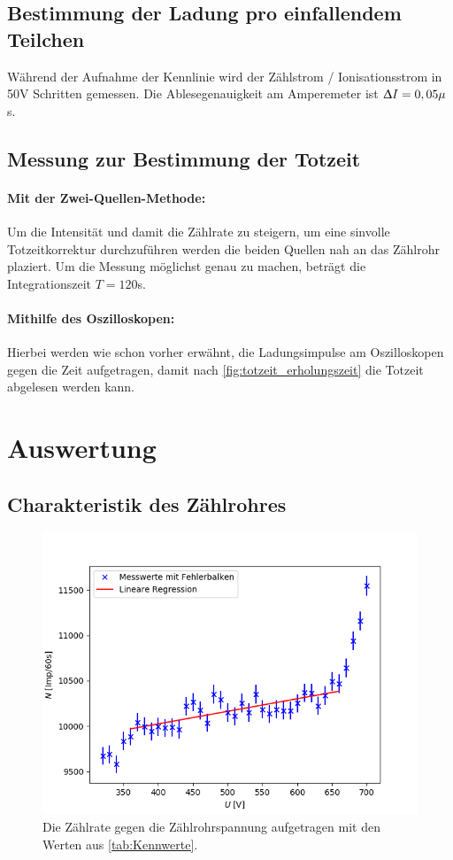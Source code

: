 \documentclass[titlepage = firstcover]{scrartcl}
\begin{document}
      \subsection{Bestimmung der Ladung pro einfallendem Teilchen}
        Während der Aufnahme der Kennlinie wird der Zählstrom / Ionisationsstrom in 50V Schritten gemessen. Die Ablesegenauigkeit am Amperemeter ist $\Updelta I = 0,05 \mu$s.

      \subsection{Messung zur Bestimmung der Totzeit}
        \paragraph{Mit der Zwei-Quellen-Methode:}
          Um die Intensität und damit die Zählrate zu steigern, um eine sinvolle Totzeitkorrektur durchzuführen werden die beiden Quellen nah an das Zählrohr plaziert. Um die Messung möglichst genau zu machen, beträgt die Integrationszeit $T = 120$s.
        \paragraph{Mithilfe des Oszilloskopen:}
          Hierbei werden wie schon vorher erwähnt, die Ladungsimpulse am Oszilloskopen gegen die Zeit aufgetragen, damit nach \autoref{fig:totzeit_erholungszeit} die Totzeit abgelesen werden kann.

    
    \newpage
    \section{Auswertung}
      \subsection{Charakteristik des Zählrohres}
      \begin{figure}[h]
        \centering
        \includegraphics[width = 0.8\linewidth]{Plateau.png}
        \caption{Die Zählrate gegen die Zählrohrspannung aufgetragen mit den Werten aus \autoref{tab:Kennwerte}.}
        \label{fig:totzeit_erholungszeit}
      \end{figure}
      \FloatBarrier
      
\end{document}
